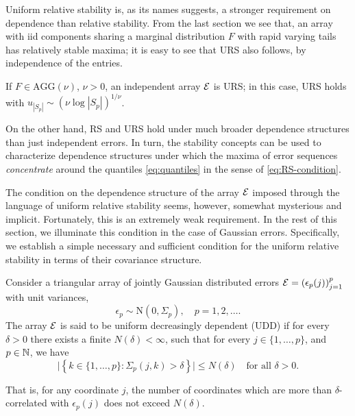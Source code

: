 Uniform relative stability is, as its names suggests, a stronger requirement on dependence than relative stability. 
From the last section we see that, an array with iid components sharing a marginal distribution $F$ with rapid varying tails has relatively stable maxima; it is easy to see that URS also follows, by independence of the entries.

\begin{corollary} \label{cor:AGG-is-URS}
If $F\in\text{AGG}(\nu)$, $\nu>0$, an independent array ${\cal E}$ is URS; in this case, URS holds with $u_{|S_p|} \sim \left(\nu\log{|S_p|}\right)^{1/\nu}$.
\end{corollary}

On the other hand, RS and URS hold under much broader dependence structures than just 
independent errors. In turn, the stability concepts can be used to characterize dependence structures under which the maxima of error sequences {\em concentrate} around the quantiles \eqref{eq:quantiles} in the sense of \eqref{eq:RS-condition}.

The condition on the dependence structure of the array ${\cal E}$ imposed through the language of 
uniform relative stability seems, however, somewhat mysterious and implicit.  Fortunately, this is an 
extremely weak requirement.  In the rest of this section, we illuminate this condition in the case of 
Gaussian errors.  Specifically, we establish a simple necessary and sufficient condition for the 
uniform relative stability in terms of their covariance structure. 


\begin{definition} \label{def:UDD}
Consider a triangular array of jointly Gaussian distributed errors 
${\cal E} = \left(\epsilon_p(j)\right)_{j=1}^p$ 
with unit variances,
$$
\epsilon_p \sim \text{N}(0, \Sigma_p), \quad p=1,2,\ldots.
$$
The array ${\cal E}$ is said to be uniform decreasingly dependent (UDD) if 
for every $\delta>0$ there exists a finite $N(\delta)<\infty$, such that for every $j\in\{1,\ldots,p\}$, and $p\in\mathbb N$, we have
\begin{equation} \label{eq:UDD-definition}
    \Big|\left\{k\in\{1,\ldots,p\}:\Sigma_p(j,k)>\delta\right\}\Big| \le N(\delta)\quad \text{for all  } \delta>0.
\end{equation}
\end{definition}
That is, for any coordinate $j$, the number of coordinates which are more than $\delta$-correlated with $\epsilon_p(j)$ does not exceed $N(\delta)$. 

